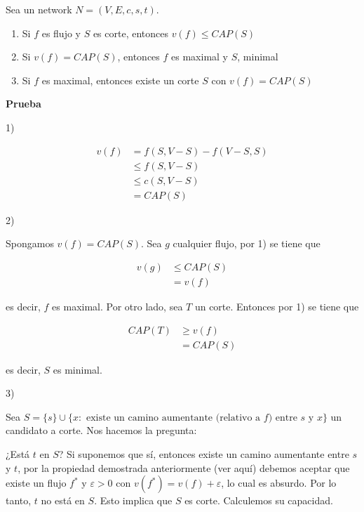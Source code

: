 \documentclass[10pt,a4paper]{article}
\begin{document}
Sea un network $N = (V, E, c, s, t)$.

\begin{enumerate}

	\item Si $f$ es flujo y $S$ es corte, entonces $v(f) \leq CAP(S) $
	\item Si $v(f) = CAP(S)$, entonces $f$ es maximal y $S$, minimal
	\item Si $f$ es maximal, entonces existe un corte $S$ con $v(f) = CAP(S)$
\end{enumerate}

\textbf{Prueba}

1)

\begin{center}
\begin{align*} v(f) &= f(S, V - S) - f(V-S, S)\\ &\leq f(S, V - S) \\ &\leq c(S, V - S)\\ &= CAP(S) \end{align*}
\end{center}

2)

Spongamos $v(f) = CAP(S)$. Sea $g$ cualquier flujo, por 1) se tiene que

\begin{center}
\begin{align*} v(g) &\leq CAP(S)\\ &= v(f) \end{align*}
\end{center}

es decir, $f$ es maximal. Por otro lado, sea $T$ un corte. Entonces por 1) se tiene que

\begin{center}
\begin{align*} CAP(T) &\geq v(f)\\& = CAP(S) \end{align*}
\end{center}

es decir, $S$ es minimal.

3)

Sea $S =\{s\}\cup\{x: \text{ existe un camino aumentante (relativo a } f \text{)}\text{ entre }s \text{ y } x \}$ un candidato a corte. Nos hacemos la pregunta:

¿Está $t$ en $S$? Si suponemos que sí, entonces existe un camino aumentante entre $s$ y $t$, por la propiedad demostrada anteriormente (ver aquí) debemos aceptar que existe un flujo $f^*$ y $\varepsilon > 0$ con $v(f^*) = v(f) + \varepsilon$, lo cual es absurdo. Por lo tanto, $t$ no está en $S$. Esto implica que $S$ es corte. Calculemos su capacidad.
\end{document}
